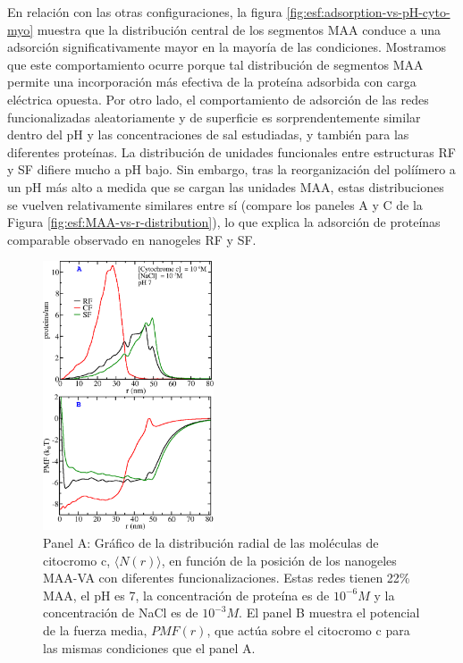  En relaci\'on con las otras configuraciones, la figura \ref{fig:esf:adsorption-vs-pH-cyto-myo} muestra que la distribuci\'on central de los segmentos MAA conduce a una adsorci\'on significativamente mayor en la mayor\'ia de las condiciones.
 Mostramos que este comportamiento ocurre porque tal distribuci\'on de segmentos MAA permite una incorporaci\'on m\'as efectiva de la prote\'ina adsorbida con carga el\'ectrica opuesta.
 Por otro lado, el comportamiento de adsorci\'on de las redes funcionalizadas aleatoriamente y de superficie es sorprendentemente similar dentro del pH y las concentraciones de sal estudiadas, y tambi\'en para las diferentes prote\'inas.
 La distribuci\'on de unidades funcionales entre estructuras RF y SF difiere mucho a pH bajo.
 Sin embargo, tras la reorganizaci\'on del polí\'imero a un pH m\'as alto a medida que se cargan las unidades MAA, estas distribuciones se vuelven relativamente similares entre s\'i (compare los paneles A y C de la Figura \ref{fig:esf:MAA-vs-r-distribution}), lo que explica la adsorci\'on de prote\'inas comparable observado en nanogeles RF y SF.





\begin{figure}[!htb]
     \centering
     \includegraphics[width=0.45\textwidth]{Figures/graphs-gel2/cyto-adsr-pmf.png}
     \caption{Panel A: Gr\'afico de la distribuci\'on radial de las mol\'eculas de citocromo c, $\langle N(r)\rangle$, en funci\'on de la posici\'on de los nanogeles MAA-VA con diferentes funcionalizaciones.
     	Estas redes tienen 22\% MAA, el pH es 7, la concentraci\'on de prote\'ina es de $10^{-6}M$ y la concentraci\'on de NaCl es de $10^{-3}M$.
     	El panel B muestra el potencial de la fuerza media, ${PMF}(r)$, que act\'ua sobre el citocromo c para las mismas condiciones que el panel A.}
     \label{fig:esf:adsorption-vs-r-cyto}
 \end{figure}



